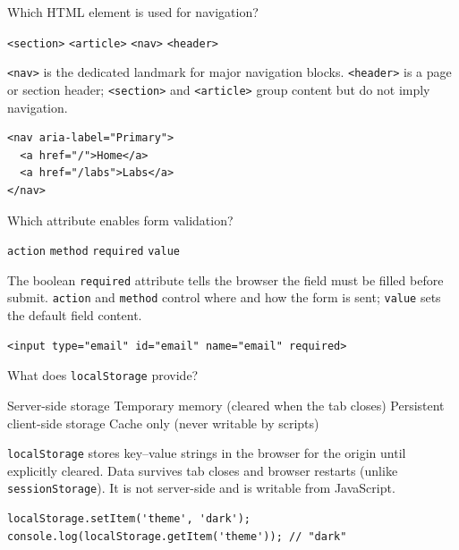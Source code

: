 \question[4]
Which HTML element is used for navigation?
\begin{choices}
  \choice \texttt{<section>}
  \choice \texttt{<article>}
  \CorrectChoice \texttt{<nav>}
  \choice \texttt{<header>}
\end{choices}
\begin{solution}
  \lstinline[style=htmlinline]|<nav>| is the dedicated landmark for major navigation blocks. \lstinline[style=htmlinline]|<header>| is a page or section header; \lstinline[style=htmlinline]|<section>| and \lstinline[style=htmlinline]|<article>| group content but do not imply navigation.
\begin{lstlisting}[style=htmlinline]
<nav aria-label="Primary">
  <a href="/">Home</a>
  <a href="/labs">Labs</a>
</nav>
\end{lstlisting}
\end{solution}



\newpage



\question[4]
Which attribute enables form validation?
\begin{choices}
  \choice \texttt{action}
  \choice \texttt{method}
  \CorrectChoice \texttt{required}
  \choice \texttt{value}
\end{choices}
\begin{solution}
  The boolean \lstinline[style=htmlinline]|required| attribute tells the browser the field must be filled before submit. \lstinline[style=htmlinline]|action| and \lstinline[style=htmlinline]|method| control where and how the form is sent; \lstinline[style=htmlinline]|value| sets the default field content.
\begin{lstlisting}[style=htmlinline]
<input type="email" id="email" name="email" required>
\end{lstlisting}
\end{solution}

\question[4]
What does \lstinline[style=jsinline]|localStorage| provide?
\begin{choices}
  \choice Server-side storage
  \choice Temporary memory (cleared when the tab closes)
  \CorrectChoice Persistent client-side storage
  \choice Cache only (never writable by scripts)
\end{choices}
\begin{solution}
  \lstinline[style=jsinline]|localStorage| stores key--value strings in the browser for the origin until explicitly cleared. Data survives tab closes and browser restarts (unlike \lstinline[style=jsinline]|sessionStorage|). It is not server-side and is writable from JavaScript.
\begin{lstlisting}[style=js]
localStorage.setItem('theme', 'dark');
console.log(localStorage.getItem('theme')); // "dark"
\end{lstlisting}
\end{solution}

